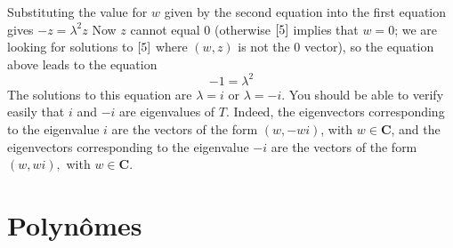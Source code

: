 \documentclass[12pt]{book}
\theoremstyle{definition}\newtheorem{dfn}{Définition}[chapter]
\theoremstyle{plain}\newtheorem{thm}{Théorème}[chapter]
\theoremstyle{plain}\newtheorem{prp}{Proposition}[chapter]
\theoremstyle{plain}\newtheorem{lem}{\bf Lemme}[chapter]
\theoremstyle{plain}\newtheorem{axm}{\bf Axiome}[chapter]
\theoremstyle{plain}\newtheorem{lmm}{\bf Lemme}[chapter]
\theoremstyle{plain}\newtheorem{exm}{\bf Example}[chapter]
\theoremstyle{plain}\newtheorem{cor}{\bf Corollaire}[chapter]
\theoremstyle{remark}\newtheorem{rem}{Remarque}[chapter]
\begin{document}
Substituting the value for $w$ given by the second equation into the first equation gives $-z=\lambda^{2} z$
Now $z$ cannot equal 0 (otherwise $\ref{5}$ implies that $w=0$; we are looking for solutions to $\ref{5}$ where $(w, z)$ is not the 0 vector), so the equation above leads to the equation
$$
-1=\lambda^{2}
$$
The solutions to this equation are $\lambda=i$ or $\lambda=-i$. You should be able to verify easily that $i$ and $-i$ are eigenvalues of $T .$ Indeed, the eigenvectors corresponding to the eigenvalue $i$ are the vectors of the form $(w,-w i)$, with $w \in \mathbf{C}$, and the eigenvectors corresponding to the eigenvalue $-i$ are the vectors of the form $(w, w i),$ with $w \in \mathbf{C}.$




\chapter{Polynômes}
\end{document}
